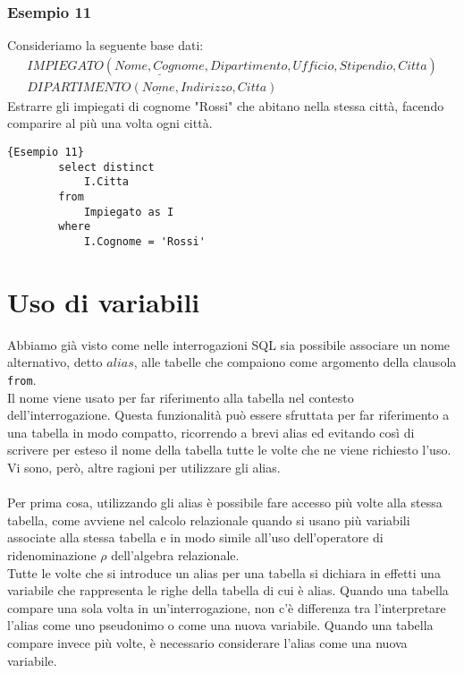 \subsubsection{Esempio 11}
Consideriamo la seguente base dati:
    \begin{equation}\begin{aligned}
        IMPIEGATO (\underline{Nome, Cognome}, Dipartimento, Ufficio, Stipendio, Citta)\\
        DIPARTIMENTO (\underline{Nome}, Indirizzo, Citta)
    \end{aligned}\end{equation}
Estrarre gli impiegati di cognome "Rossi" che abitano nella stessa città, facendo comparire al più una volta ogni città.
    \begin{lstlisting}{Esempio 11}
        select distinct
            I.Citta
        from 
            Impiegato as I
        where 
            I.Cognome = 'Rossi'
    \end{lstlisting}



\section{Uso di variabili}
Abbiamo già visto come nelle interrogazioni SQL sia possibile associare un nome alternativo, detto $alias$, alle tabelle che compaiono come argomento della clausola \texttt{from}.\\
Il nome viene usato per far riferimento alla tabella nel contesto dell'interrogazione. Questa funzionalità può essere sfruttata per far riferimento a una tabella in modo compatto, ricorrendo a brevi alias ed evitando così di scrivere per esteso il nome della tabella tutte le volte che ne viene richiesto l'uso. Vi sono, però, altre ragioni per utilizzare gli alias.\\\\
Per prima cosa, utilizzando gli alias è possibile fare accesso più volte alla stessa tabella, come avviene nel calcolo relazionale quando si usano più variabili associate alla stessa tabella e in modo simile all'uso dell'operatore di ridenominazione $\rho$ dell'algebra relazionale.\\
Tutte le volte che si introduce un alias per una tabella si dichiara in effetti una variabile che rappresenta le righe della tabella di cui è alias. Quando una tabella compare una sola volta in un'interrogazione, non c'è differenza tra l'interpretare l'alias come uno pseudonimo o come una nuova variabile. Quando una tabella compare invece più volte, è necessario considerare l'alias come una nuova variabile.

